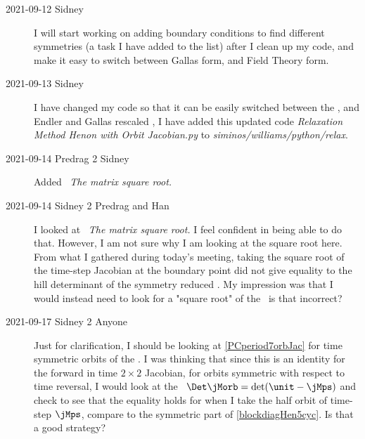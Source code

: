 \begin{description}

\item[2021-09-12 Sidney]

I will start working on adding boundary
conditions to find different symmetries (a task I have added to the list)
after I clean up my code, and make it easy to switch between Gallas form,
and Field Theory form.

\item[2021-09-13 Sidney]
I have changed my code so that it can be easily switched between
the \Henon{} , and Endler and Gallas
rescaled , I have added this updated code
\emph{Relaxation Method Henon with Orbit Jacobian.py} to
\emph{siminos/williams/python/relax}.

\item[2021-09-14 Predrag 2 Sidney]
Added ~{\em The matrix square root.}

\item[2021-09-14 Sidney 2 Predrag and Han]
I looked at ~{\em The matrix square root.} I feel
confident in being able to do that. However, I am not sure why I am
looking at the square root here. From what I gathered during today's
meeting, taking the square root of the time-step Jacobian at the boundary
point did not give equality to the hill determinant of the symmetry
reduced {\jacobianOrb}. My impression was that I would instead need to
look for a "square root" of the \henlatt\ is that incorrect?

\item[2021-09-17 Sidney 2 Anyone]
Just for clarification, I should be looking at \eqref{PCperiod7orbJac}
for time symmetric orbits of the \henlatt. I was thinking that since this
is an identity for the forward in time $2\times2$ Jacobian, for orbits
symmetric with respect to time reversal, I would look at the \HillDet\
$\Det \jMorb=\det(\unit-\jMps)$ and check to see that the equality
holds for when I take the half orbit of time-step $\jMps$, compare to the
symmetric part of \eqref{blockdiagHen5cyc}. Is that a good strategy?


\end{description}
